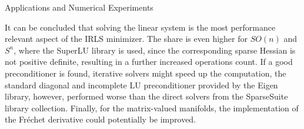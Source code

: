 \begin{chapter}{Applications and Numerical Experiments}
\begin{table}[h!]
\centering
\footnotesize
{}
\caption[Share of total CPU cycles $SPD(3)$ , $300\times 300$ pixel]{Share of total CPU cycles for IRLS minimization of synthetic $SPD(3)$ , $300\times 300$ pixel, $M=SPD(3)$
\label{table:perf_spd300}
}
\end{table}

It can be concluded that solving the linear system is the most performance relevant aspect of the IRLS minimizer. The share is even higher for $SO(n)$ and $S^n$, where the SuperLU library is used, 
since the corresponding sparse Hessian is not positive definite, resulting in a further increased operations count. If a good preconditioner is found, iterative solvers might speed up the computation, 
the standard diagonal and incomplete LU preconditioner provided by the Eigen library, however, performed worse than the direct solvers from the SparseSuite library collection. Finally, for
the matrix-valued manifolds, the implementation of the Fr\'{e}chet derivative could potentially be improved.


\end{chapter}
